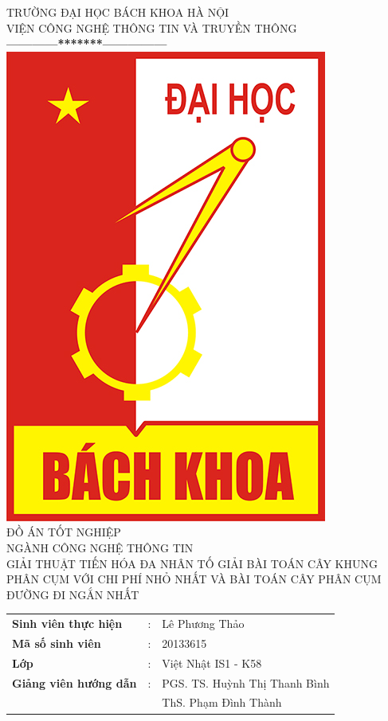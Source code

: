 \thispagestyle{empty}
\thisfancypage{
	\setlength{\fboxrule}{1pt}
	\doublebox}{}
\begin{center}
{\fontsize{16}{19}\selectfont TRƯỜNG ĐẠI HỌC BÁCH KHOA HÀ NỘI\\ VIỆN CÔNG NGHỆ THÔNG TIN VÀ TRUYỀN THÔNG}\\
\textbf{------------*******---------------}\\[1cm]
\includegraphics[scale=0.5]{logo-hust.jpg}\\[1.3cm]
{\fontsize{23}{43}\selectfont ĐỒ ÁN TỐT NGHIỆP}\\[0.1cm]
{\fontsize{25}{10}\selectfont NGÀNH CÔNG NGHỆ THÔNG TIN}\\[0.9cm]
{\fontsize{20}{24}\selectfont GIẢI THUẬT TIẾN HÓA ĐA NHÂN TỐ GIẢI BÀI TOÁN CÂY KHUNG PHÂN CỤM VỚI CHI PHÍ NHỎ NHẤT VÀ BÀI TOÁN CÂY PHÂN CỤM ĐƯỜNG ĐI NGẮN NHẤT}\\[2.5cm]


\begin{tabular}{l c l}
	\textbf{Sinh viên thực hiện} & : & Lê Phương Thảo \\ 
	\textbf{Mã số sinh viên} & : & 20133615  \\ 
	\textbf{Lớp} & : & Việt Nhật IS1 - K58  \\
	\textbf{Giảng viên hướng dẫn} & : &  PGS. TS. Huỳnh Thị Thanh Bình  \\ 
	\textbf{} &  &  ThS. Phạm Đình Thành  \\ 
\end{tabular} \\[2.5cm]


\end{center}
